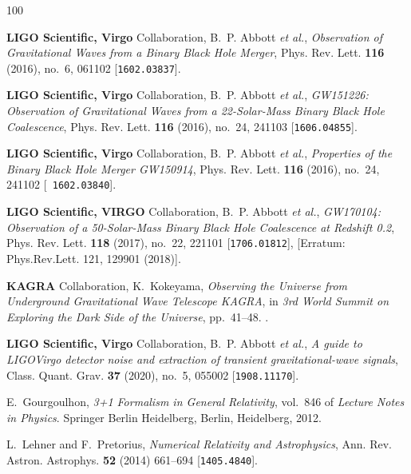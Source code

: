 \providecommand{\href}[2]{#2}\begingroup\raggedright\begin{thebibliography}{100}

{\bf LIGO Scientific, Virgo} Collaboration, B.~P. Abbott {\em et al.},  {\em
  {Observation of Gravitational Waves from a Binary Black Hole Merger}}, Phys.
  Rev. Lett. {\bf 116} (2016), no.~6, 061102
  [\href{http://www.arXiv.org/abs/1602.03837}{{\tt 1602.03837}}].

{\bf LIGO Scientific, Virgo} Collaboration, B.~P. Abbott {\em et al.},  {\em
  {GW151226: Observation of Gravitational Waves from a 22-Solar-Mass Binary
  Black Hole Coalescence}}, Phys. Rev. Lett. {\bf 116} (2016), no.~24, 241103
  [\href{http://www.arXiv.org/abs/1606.04855}{{\tt 1606.04855}}].

{\bf LIGO Scientific, Virgo} Collaboration, B.~P. Abbott {\em et al.},  {\em
  {Properties of the Binary Black Hole Merger GW150914}}, Phys. Rev. Lett. {\bf
  116} (2016), no.~24, 241102 [\href{http://www.arXiv.org/abs/1602.03840}{{\tt
  1602.03840}}].

{\bf LIGO Scientific, VIRGO} Collaboration, B.~P. Abbott {\em et al.},  {\em
  {GW170104: Observation of a 50-Solar-Mass Binary Black Hole Coalescence at
  Redshift 0.2}}, Phys. Rev. Lett. {\bf 118} (2017), no.~22, 221101
  [\href{http://www.arXiv.org/abs/1706.01812}{{\tt 1706.01812}}], [Erratum:
  Phys.Rev.Lett. 121, 129901 (2018)].

{\bf KAGRA} Collaboration, K.~Kokeyama,  {\em {Observing the Universe from
  Underground Gravitational Wave Telescope KAGRA}}, in {\em {3rd World Summit
  on Exploring the Dark Side of the Universe}}, pp.~41--48.
.

{\bf LIGO Scientific, Virgo} Collaboration, B.~P. Abbott {\em et al.},  {\em {A
  guide to LIGO\textendash{}Virgo detector noise and extraction of transient
  gravitational-wave signals}}, Class. Quant. Grav. {\bf 37} (2020), no.~5,
  055002 [\href{http://www.arXiv.org/abs/1908.11170}{{\tt 1908.11170}}].

E.~Gourgoulhon, {\em 3+1 Formalism in General Relativity}, vol.~846 of {\em
  Lecture Notes in Physics}.
\newblock Springer Berlin Heidelberg, Berlin, Heidelberg, 2012.

L.~Lehner and F.~Pretorius,  {\em {Numerical Relativity and Astrophysics}},
  Ann. Rev. Astron. Astrophys. {\bf 52} (2014) 661--694
  [\href{http://www.arXiv.org/abs/1405.4840}{{\tt 1405.4840}}].


\end{thebibliography}
